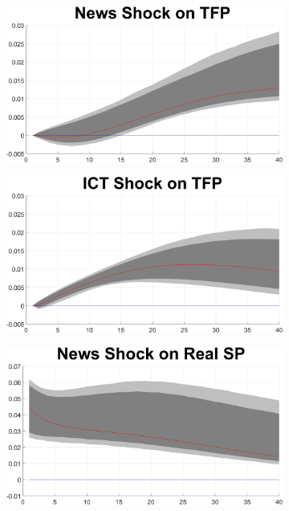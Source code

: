 \documentclass[12pt]{article}
\begin{document}
\begin{figure}[h!]
	\begin{subfigure}{.5\textwidth}
		\centering
		\includegraphics[width=1\linewidth]{MainFigures/fig_News_Shock_on_TFP__controllinNEWS_}
	\end{subfigure}%
	\begin{subfigure}{.5\textwidth}
		\centering
		\includegraphics[width=1\linewidth]{MainFigures/fig_ICT_Shock_on_TFP__controllinNEWS_}
	\end{subfigure}
\begin{subfigure}{.5\textwidth}
	\centering
	\includegraphics[width=1\linewidth]{MainFigures/fig_News_Shock_on_Real_SP__controllinNEWS_}

\end{subfigure}
\end{figure}
\end{document}
